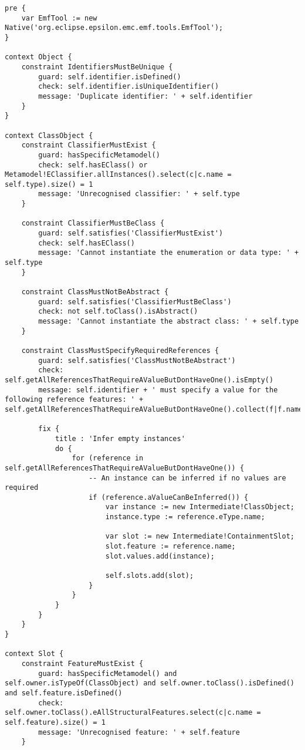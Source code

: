 \begin{lstlisting}[caption=Syntactic and Conformance Constraints in EVL., label=lst:constraints_full, language=EVL]
pre {
	var EmfTool := new Native('org.eclipse.epsilon.emc.emf.tools.EmfTool');
}

context Object {	
	constraint IdentifiersMustBeUnique {
		guard: self.identifier.isDefined()
		check: self.identifier.isUniqueIdentifier()
		message: 'Duplicate identifier: ' + self.identifier
	}
}

context ClassObject {
	constraint ClassifierMustExist {
		guard: hasSpecificMetamodel()
		check: self.hasEClass() or Metamodel!EClassifier.allInstances().select(c|c.name = self.type).size() = 1
		message: 'Unrecognised classifier: ' + self.type
	}
	
	constraint ClassifierMustBeClass {
		guard: self.satisfies('ClassifierMustExist')
		check: self.hasEClass()
		message: 'Cannot instantiate the enumeration or data type: ' + self.type
	}
	
	constraint ClassMustNotBeAbstract {
		guard: self.satisfies('ClassifierMustBeClass')
		check: not self.toClass().isAbstract()
		message: 'Cannot instantiate the abstract class: ' + self.type
	}
	
	constraint ClassMustSpecifyRequiredReferences {
		guard: self.satisfies('ClassMustNotBeAbstract')
		check: self.getAllReferencesThatRequireAValueButDontHaveOne().isEmpty() 
		message: self.identifier + ' must specify a value for the following reference features: ' + self.getAllReferencesThatRequireAValueButDontHaveOne().collect(f|f.name).toString()
		
		fix {
			title : 'Infer empty instances'
			do {
				for (reference in self.getAllReferencesThatRequireAValueButDontHaveOne()) {
					-- An instance can be inferred if no values are required	
					if (reference.aValueCanBeInferred()) {
						var instance := new Intermediate!ClassObject;
						instance.type := reference.eType.name;
						
						var slot := new Intermediate!ContainmentSlot;
						slot.feature := reference.name;
						slot.values.add(instance);
						
						self.slots.add(slot);
					}
				}
			}
		}
	}
}

context Slot {
	constraint FeatureMustExist {
		guard: hasSpecificMetamodel() and self.owner.isTypeOf(ClassObject) and self.owner.toClass().isDefined() and self.feature.isDefined() 
		check: self.owner.toClass().eAllStructuralFeatures.select(c|c.name = self.feature).size() = 1
		message: 'Unrecognised feature: ' + self.feature
	}
	

\end{lstlisting}
